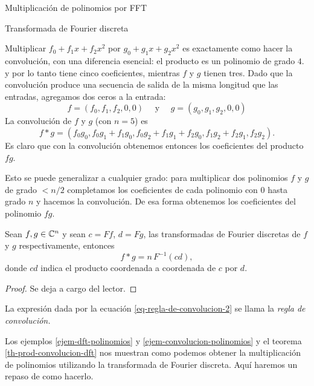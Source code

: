 \begin{chapter}{Multiplicación de polinomios por FFT}
\begin{section}{Transformada de Fourier discreta}
\begin{ejemplo}
      Multiplicar $f_0 + f_1x + f_2x^2$ por $g_0 + g_1x + g_2x^2$ es exactamente como hacer la convolución, con una diferencia esencial: el producto es un polinomio de grado $4$. y por lo tanto tiene cinco coeficientes, mientras $f$ y $g$ tienen tres. Dado que la convolución produce una secuencia de salida de la misma longitud que las entradas, agregamos dos ceros a la entrada:
      \begin{equation*}
          f = (f_0,f_1,f_2,0,0) \quad \text{ y }\quad g = (g_0,g_1,g_2,0,0)
      \end{equation*}
      La convolución de $f$ y $g$ (con $n = 5$) es
      \begin{equation*}
          f * g = (f_0g_0, f_0g_1 + f_1g_0 , f_0g_2 + f_1g_1+ f_2g_0, f_1g_2 + f_2g_1, f_2g_2 ).
      \end{equation*}
      Es claro que con la convolución obtenemos entonces  los coeficientes del producto $fg$.

      Esto se puede generalizar a cualquier grado:  para multiplicar dos polinomios $f$ y $g$ de grado $<n/2$ completamos los coeficientes de cada polinomio  con $0$ hasta grado $n$ y hacemos la convolución. De esa forma obtenemos los coeficientes del polinomio $fg$.
  \end{ejemplo}


  \begin{teorema}\label{th-prod-convolucion-dft}
      Sean $f,g \in \mathbb C^n$ y  sean $c= Ff$, $d = Fg$, las transformadas de Fourier discretas de $f$ y $g$ respectivamente, entonces
      \begin{equation}\label{eq-regla-de-convolucion-2}
          f * g = n\,  F^{-1}(cd),
      \end{equation}
      donde $cd$  indica el producto coordenada a coordenada de $c$ por $d$.
  \end{teorema}
  \begin{proof}
      Se deja a cargo del lector.
  \end{proof}

  La expresión dada por la ecuación  \eqref{eq-regla-de-convolucion-2} se llama la  \textit{regla de convolución.}

  \begin{ejemplo*} Los ejemplos \ref{ejem-dft-polinomios} y \ref{ejem-convolucion-polinomios} y  el teorema \ref{th-prod-convolucion-dft} nos  muestran como podemos obtener  la multiplicación de polinomios utilizando la transformada de Fourier discreta. Aquí haremos un repaso de como hacerlo.


\end{ejemplo*}
\end{section}
\end{chapter}
